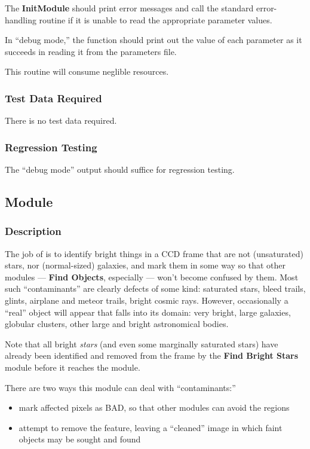   The {\bf InitModule} should print error messages and call the standard
error-handling routine if it is unable to read the appropriate parameter
values.  

  In ``debug mode,'' the function should print out the value of 
each parameter as it succeeds in reading it from the parameters file.

  This routine will consume neglible resources.

\subsubsection {Test Data Required}

  There is no test data required.

\subsubsection {Regression Testing}

  The ``debug mode'' output should suffice for regression testing.

\subsection {Module}

\subsubsection {Description}

  The job of \bom is to identify bright things in a CCD frame that are
not (unsaturated) stars, nor (normal-sized) galaxies, and mark
them in some way so that other modules --- {\bf Find Objects}, especially ---
won't become confused by them.
Most such ``contaminants'' are clearly defects of some kind: saturated
stars, bleed trails, glints, airplane and meteor trails, bright
cosmic rays.  However, occasionally a ``real'' object will appear that
falls into its domain: very bright, large galaxies, globular clusters,
other large and bright astronomical bodies.

  Note that all bright {\it stars} (and even some marginally saturated
stars) have already been identified and removed from the frame by the
{\bf Find Bright Stars} module before it reaches the \bom module.

  There are two ways this module can deal with ``contaminants:''

\begin{itemize}
  \item mark affected pixels as BAD, so that other modules can
        avoid the regions 
  \item attempt to remove the feature, leaving a ``cleaned'' image
        in which faint objects may be sought and found
\end{itemize}

